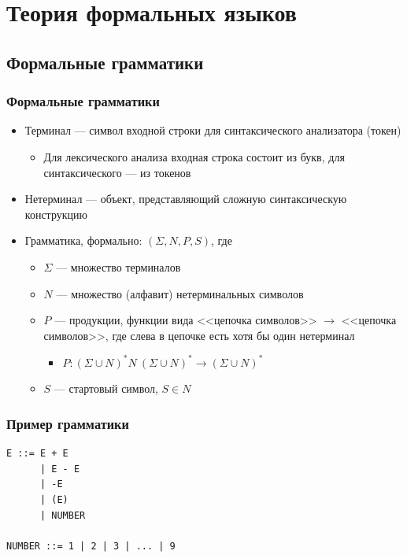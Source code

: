 \documentclass[xetex,mathserif,serif]{beamer}
\begin{document}
    \section{Теория формальных языков}

    \subsection{Формальные грамматики}

    \begin{frame}
        \frametitle{Формальные грамматики}
        \begin{itemize}
            \item Терминал --- символ входной строки для синтаксического анализатора (токен)
            \begin{itemize}
                \item Для лексического анализа входная строка состоит из букв, для синтаксического --- из токенов
            \end{itemize}
            \item Нетерминал --- объект, представляющий сложную синтаксическую конструкцию
            \item Грамматика, формально: $(\Sigma, N, P, S)$, где
            \begin{itemize}
                \item $\Sigma$ --- множество терминалов
                \item $N$ --- множество (алфавит) нетерминальных символов
                \item $P$ --- продукции, функции вида <<цепочка символов>> $\rightarrow$ <<цепочка символов>>, где слева в цепочке есть хотя бы один нетерминал
                \begin{itemize}
                    \item $P: (\Sigma \cup N)^* N\ (\Sigma \cup N)^* \rightarrow (\Sigma \cup N)^*$
                \end{itemize}
                \item $S$ --- стартовый символ, $S \in N$
            \end{itemize}
        \end{itemize}
    \end{frame}

    \begin{frame}[fragile]
        \frametitle{Пример грамматики}
        \begin{verbatim}
E ::= E + E
      | E - E
      | -E
      | (E)
      | NUMBER

NUMBER ::= 1 | 2 | 3 | ... | 9
        \end{verbatim}
    \end{frame}
\end{document}
